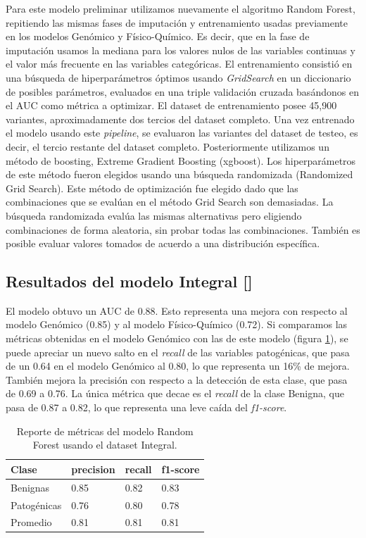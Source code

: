 Para este modelo preliminar utilizamos nuevamente el algoritmo Random Forest, repitiendo las mismas fases de imputación y entrenamiento usadas previamente en los modelos Genómico y Físico-Químico. Es decir, que en la fase de imputación usamos la mediana para los valores nulos de las variables continuas y el valor más frecuente en las variables categóricas. El entrenamiento consistió en una búsqueda de hiperparámetros óptimos usando \textit{GridSearch} en un diccionario de posibles parámetros, evaluados en una triple validación cruzada basándonos en el AUC como métrica a optimizar. El dataset de entrenamiento posee 45,900 variantes, aproximadamente dos tercios del dataset completo. Una vez entrenado el modelo usando este \textit{pipeline}, se evaluaron las variantes del dataset de testeo, es decir, el tercio restante del dataset completo. Posteriormente utilizamos un método de boosting, Extreme Gradient Boosting (xgboost). Los hiperparámetros de este método fueron elegidos usando una búsqueda randomizada (Randomized Grid Search). Este método de optimización fue elegido dado que las combinaciones que se evalúan en el método Grid Search son demasiadas. La búsqueda randomizada evalúa las mismas alternativas pero eligiendo combinaciones de forma aleatoria, sin probar todas las combinaciones. También es posible evaluar valores tomados de acuerdo a una distribución específica.

\subsection{Resultados del modelo Integral []}

El modelo obtuvo un AUC de 0.88. Esto representa una mejora con respecto al modelo Genómico (0.85) y al modelo Físico-Químico (0.72). Si comparamos las métricas obtenidas en el modelo Genómico con las de este modelo (figura \ref{tab:metrics_integral}), se puede apreciar un nuevo salto en el \textit{recall} de las variables patogénicas, que pasa de un 0.64 en el modelo Genómico al 0.80, lo que representa un 16\% de mejora. También mejora la precisión con respecto a la detección de esta clase, que pasa de 0.69 a 0.76. La única métrica que decae es el \textit{recall} de la clase Benigna, que pasa de 0.87 a 0.82, lo que representa una leve caída del \textit{f1-score}.

\begin{table}[H]
\centering
\begin{tabular}{|l|l|l|l|}
\hline
Clase        & precision & recall & f1-score \\ \hline
Benignas     & 0.85      & 0.82   & 0.83     \\ \hline
Patogénicas  & 0.76      & 0.80   & 0.78     \\ \hline
Promedio     & 0.81      & 0.81   & 0.81     \\ \hline
\end{tabular}
\caption{Reporte de métricas del modelo Random Forest usando el dataset Integral.}
\label{tab:metrics_integral}
\end{table}


